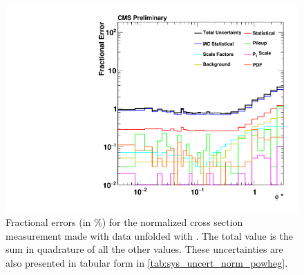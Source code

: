 \begin{figure}[!p]
    \centering
    \includegraphics[width=\textwidth]{figures/data_uncertainty_normalized_powheg_unfolded.pdf}
    \caption[
        Fractional errors (in \%) for the normalized cross section measurement
        made with data unfolded with \POWHEG.
    ]{
        Fractional errors (in \%) for the normalized cross section measurement
        made with data unfolded with \POWHEG. The total value is the sum in
        quadrature of all the other values. These uncertainties are also
        presented in tabular form in \cref{tab:sys_uncert_norm_powheg}.
    }
    \label{fig:sys_uncert_norm_powheg}
\end{figure}
